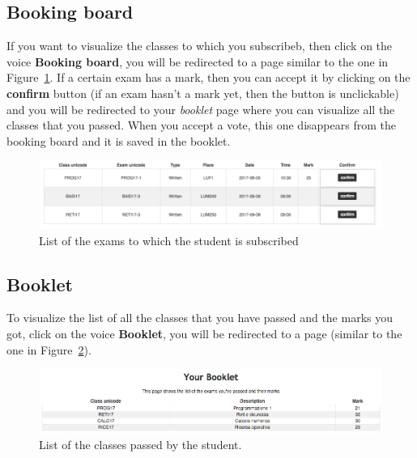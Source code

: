 \subsection{Booking board}
If you want to visualize the classes to which you subscribeb, then click on the voice \textbf{Booking board}, you will be redirected to a page similar to the one in Figure~\ref{fig:studentRecords}.  If a certain exam has a mark, then you can accept it by clicking on the \textbf{confirm} button (if an exam hasn't a mark yet, then the button is unclickable) and you will be redirected to your \emph{booklet} page where you can visualize all the classes that you passed. When you accept a vote, this one disappears from the booking board and it is saved in the booklet.
\begin{figure}[H]
	\centering
	\includegraphics[width=1.0\textwidth]{img/studentRecords.png}
	\caption{List of the exams to which the student is subscribed}
	\label{fig:studentRecords}
\end{figure}

\subsection{Booklet}
To visualize the list of  all the classes that you have passed and the marks you got, click on the voice \textbf{Booklet}, you will be redirected to a page (similar to the one in Figure~\ref{fig:booklet}).
\begin{figure}[H]
	\centering
	\includegraphics[width=1.0\textwidth]{img/booklet.png}
	\caption{List of the classes passed by the student.}
	\label{fig:booklet}
\end{figure}